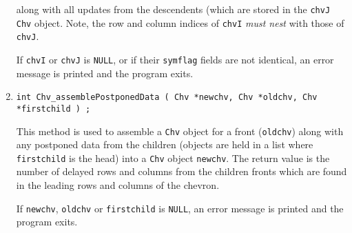 \begin{enumerate}
along with all updates from the descendents (which are stored in
the {\tt chvJ Chv} object.
Note, the row and column indices of {\tt chvI} {\it must nest}
with those of {\tt chvJ}.
\par {}
If {\tt chvI} or {\tt chvJ} is {\tt NULL},
or if their {\tt symflag} fields are not identical,
an error message is printed and the program exits.
\item
\begin{verbatim}
int Chv_assemblePostponedData ( Chv *newchv, Chv *oldchv, Chv *firstchild ) ;
\end{verbatim}
This method is used to assemble a {\tt Chv} object for a front
({\tt oldchv})
along with any postponed data from the children
(objects are held in a list where {\tt firstchild} is the head)
into a {\tt Chv} object {\tt newchv}.
The return value is the number of delayed rows and columns from the
children fronts which are found in the leading rows and columns of
the chevron.
\par {}
If {\tt newchv}, {\tt oldchv} or {\tt firstchild} is {\tt NULL},
an error message is printed and the program exits.
\end{enumerate}
\par
